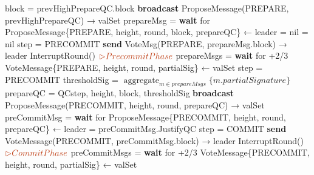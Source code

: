 \documentclass[a4paper]{article}
\DeclareMathOperator*{\aggregate}{aggregate}
\begin{document}
\begin{algorithm}
\begin{algorithmic}[1]
                \State block = {\color{MidnightBlue} prevHighPrepareQC}.block
            \EndIf
            \State \textbf{broadcast} ProposeMessage(PREPARE, {\color{MidnightBlue} prevHighPrepareQC}) → valSet
        \Else \quad {\color{Gray} { // IsReplica}}
            \State prepareMsg = \textbf{wait} for ProposeMessage\{PREPARE, height, round, block, prepareQC\} ← leader
               = nil
               = nil
              \State step = PRECOMMIT
              \State \textbf{send} VoteMsg(PREPARE, prepareMsg.block) → leader
            \Else
              \State InterruptRound()
            \EndIf
          \EndIf
        \bigskip
        \newline ${\color{Bittersweet} {\rhd Precommit Phase}}$
            \State prepareMsgs = \textbf{wait} for {+2/3} VoteMessage\{\textsc{PREPARE}, height, round, partialSig\} ← valSet
            \State step = PRECOMMIT
            \State thresholdSig = ${\aggregate_{m \in prepareMsgs} \{m.partialSignature\}}$
            \State prepareQC = QC{step, height, block, thresholdSig}
            \State \textbf{broadcast} ProposeMessage(PRECOMMIT, height, round, prepareQC) → valSet
        \Else \quad {\color{Gray} { // IsReplica}}
          \State preCommitMsg = \textbf{wait} for ProposeMessage\{PRECOMMIT, height, round, prepareQC\} ← leader
             = preCommitMsg.JustifyQC
            \State step = COMMIT
            \State \textbf{send} VoteMessage(PRECOMMIT, preCommitMsg.block) → leader
          \Else
            \State InterruptRound()
          \EndIf
        \EndIf
      \vspace {5 mm}
      \newline ${\color{Bittersweet} {\rhd Commit Phase}}$
          \State preCommitMsgs = \textbf{wait} for {+2/3} VoteMessage\{\textsc{PRECOMMIT}, height, round, partialSig\} ← valSet

\end{algorithmic}
\end{algorithm}
\end{document}

